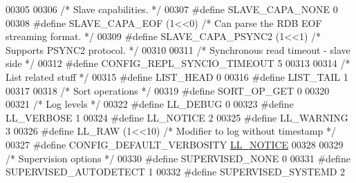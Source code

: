 \begin{DoxyCode}
{{{{{{00305 
00306 \textcolor{comment}{/* Slave capabilities. */}
00307 \textcolor{preprocessor}{#}\textcolor{preprocessor}{define} \textcolor{preprocessor}{SLAVE\_CAPA\_NONE} 0
00308 \textcolor{preprocessor}{#}\textcolor{preprocessor}{define} \textcolor{preprocessor}{SLAVE\_CAPA\_EOF} \textcolor{preprocessor}{(}1\textcolor{preprocessor}{<<}0\textcolor{preprocessor}{)}    \textcolor{comment}{/* Can parse the RDB EOF streaming format. */}
00309 \textcolor{preprocessor}{#}\textcolor{preprocessor}{define} \textcolor{preprocessor}{SLAVE\_CAPA\_PSYNC2} \textcolor{preprocessor}{(}1\textcolor{preprocessor}{<<}1\textcolor{preprocessor}{)} \textcolor{comment}{/* Supports PSYNC2 protocol. */}
00310 
00311 \textcolor{comment}{/* Synchronous read timeout - slave side */}
00312 \textcolor{preprocessor}{#}\textcolor{preprocessor}{define} \textcolor{preprocessor}{CONFIG\_REPL\_SYNCIO\_TIMEOUT} 5
00313 
00314 \textcolor{comment}{/* List related stuff */}
00315 \textcolor{preprocessor}{#}\textcolor{preprocessor}{define} \textcolor{preprocessor}{LIST\_HEAD} 0
00316 \textcolor{preprocessor}{#}\textcolor{preprocessor}{define} \textcolor{preprocessor}{LIST\_TAIL} 1
00317 
00318 \textcolor{comment}{/* Sort operations */}
00319 \textcolor{preprocessor}{#}\textcolor{preprocessor}{define} \textcolor{preprocessor}{SORT\_OP\_GET} 0
00320 
00321 \textcolor{comment}{/* Log levels */}
00322 \textcolor{preprocessor}{#}\textcolor{preprocessor}{define} \textcolor{preprocessor}{LL\_DEBUG} 0
00323 \textcolor{preprocessor}{#}\textcolor{preprocessor}{define} \textcolor{preprocessor}{LL\_VERBOSE} 1
00324 \textcolor{preprocessor}{#}\textcolor{preprocessor}{define} \textcolor{preprocessor}{LL\_NOTICE} 2
00325 \textcolor{preprocessor}{#}\textcolor{preprocessor}{define} \textcolor{preprocessor}{LL\_WARNING} 3
00326 \textcolor{preprocessor}{#}\textcolor{preprocessor}{define} \textcolor{preprocessor}{LL\_RAW} \textcolor{preprocessor}{(}1\textcolor{preprocessor}{<<}10\textcolor{preprocessor}{)} \textcolor{comment}{/* Modifier to log without timestamp */}
00327 \textcolor{preprocessor}{#}\textcolor{preprocessor}{define} \textcolor{preprocessor}{CONFIG\_DEFAULT\_VERBOSITY} \hyperlink{server_8h_a8c54c191e436c7dd3012167212692401}{LL\_NOTICE}
00328 
00329 \textcolor{comment}{/* Supervision options */}
00330 \textcolor{preprocessor}{#}\textcolor{preprocessor}{define} \textcolor{preprocessor}{SUPERVISED\_NONE} 0
00331 \textcolor{preprocessor}{#}\textcolor{preprocessor}{define} \textcolor{preprocessor}{SUPERVISED\_AUTODETECT} 1
00332 \textcolor{preprocessor}{#}\textcolor{preprocessor}{define} \textcolor{preprocessor}{SUPERVISED\_SYSTEMD} 2
}}}}}}
\end{DoxyCode}
